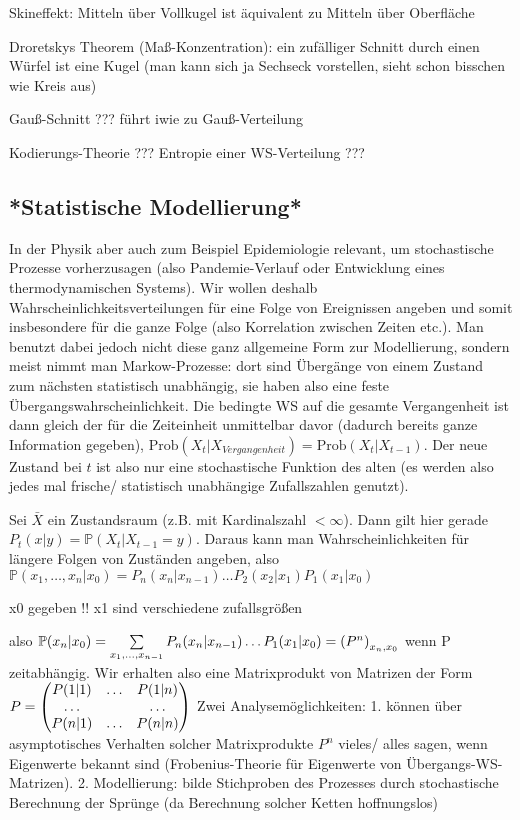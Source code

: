 \documentclass[../KlassMech_main.tex]{subfiles}
\begin{document}
Skineffekt: Mitteln über Vollkugel ist äquivalent zu Mitteln über Oberfläche

Droretskys Theorem (Maß-Konzentration): ein zufälliger Schnitt durch einen Würfel ist eine Kugel (man kann sich ja Sechseck vorstellen, sieht schon bisschen wie Kreis aus)

Gauß-Schnitt ??? führt iwie zu Gauß-Verteilung

Kodierungs-Theorie ??? Entropie einer WS-Verteilung ???



	\subsection{*Statistische Modellierung*}
In der Physik aber auch zum Beispiel Epidemiologie relevant, um stochastische Prozesse vorherzusagen (also Pandemie-Verlauf oder Entwicklung eines thermodynamischen Systems). Wir wollen deshalb Wahrscheinlichkeitsverteilungen für eine Folge von Ereignissen angeben und somit insbesondere für die ganze Folge (also Korrelation zwischen Zeiten etc.). Man benutzt dabei jedoch nicht diese ganz allgemeine Form zur Modellierung, sondern meist nimmt man Markow-Prozesse: dort sind Übergänge von einem Zustand zum nächsten statistisch unabhängig, sie haben also eine feste Übergangswahrscheinlichkeit. Die bedingte WS auf die gesamte Vergangenheit ist dann gleich der für die Zeiteinheit unmittelbar davor (dadurch bereits ganze Information gegeben), $\text{Prob}(X_t|X_{Vergangenheit}) = \text{Prob}(X_t|X_{t-1})$. Der neue Zustand bei $t$ ist also nur eine stochastische Funktion des alten (es werden also jedes mal frische/ statistisch unabhängige Zufallszahlen genutzt).

Sei $\bar{X}$ ein Zustandsraum (z.B. mit Kardinalszahl $< \infty$). Dann gilt hier gerade $P_t(x|y)= \mathbb{P}(X_t|X_{t-1}=y)$. Daraus kann man Wahrscheinlichkeiten für längere Folgen von Zuständen angeben, also $\mathbb{P}(x_1, \dots, x_n|x_0) = P_n(x_n|x_{n-1}) \dots P_2(x_2|x_1) P_1(x_1|x_0)$

x0 gegeben !! x1 sind verschiedene zufallsgrößen

also $\mathbb{P}(x_n|x_0) = \sum\limits_{x_1, \dots, x_{n-1}} P_n(x_n|x_{n-1}) \dots P_1(x_1|x_0) = \qty(P^n)_{x_n, x_0}$ wenn P zeitabhängig. Wir erhalten also eine Matrixprodukt von Matrizen der Form $P = \mqty( P(1|1) & \dots & P(1|n) \\ \dots & & \dots \\ P(n|1) & \dots & P(n|n) )$
Zwei Analysemöglichkeiten: 
1. können über asymptotisches Verhalten solcher Matrixprodukte $P^n$ vieles/ alles sagen, wenn Eigenwerte bekannt sind (Frobenius-Theorie für Eigenwerte von Übergangs-WS-Matrizen).
2. Modellierung: bilde Stichproben des Prozesses durch stochastische Berechnung der Sprünge (da Berechnung solcher Ketten hoffnungslos)
\end{document}

